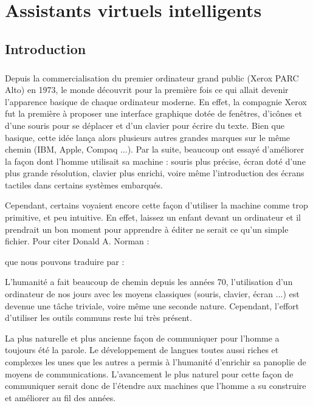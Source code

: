 \chapter{Assistants virtuels intelligents}

\section{Introduction}
\paragraph{}
Depuis la commercialisation du premier ordinateur grand public (Xerox PARC Alto) en 1973, le monde découvrit pour la première fois ce qui allait devenir l'apparence basique de chaque ordinateur moderne. En effet, la compagnie Xerox fut la première à proposer une interface graphique dotée de fenêtres, d'icônes et d'une souris pour se déplacer et d'un clavier pour écrire du texte. Bien que basique, cette idée lança alors plusieurs autres grandes marques sur le même chemin (IBM, Apple, Compaq ...). Par la suite, beaucoup ont essayé d'améliorer la façon dont l'homme utilisait sa machine : souris plus précise, écran doté d'une plus grande résolution, clavier plus enrichi, voire même l'introduction des écrans tactiles dans certains systèmes embarqués.
\par Cependant, certains voyaient encore cette façon d'utiliser la machine comme trop primitive, et peu intuitive. En effet, laissez un enfant devant un ordinateur et il prendrait un bon moment pour apprendre à éditer ne serait ce qu'un simple fichier. Pour citer Donald A. Norman \citep{don_norman} :
\begin{quote}
\end{quote}
que nous pouvons traduire par :
\begin{quote}
\end{quote} 
L'humanité a fait beaucoup de chemin depuis les années 70, l'utilisation d'un ordinateur de nos jours avec les moyens classiques (souris, clavier, écran ...) est devenue une tâche triviale, voire même une seconde nature. Cependant, l'effort d'utiliser les outils communs reste lui très présent.
\par La plus naturelle et plus ancienne façon de communiquer pour l'homme a toujours été la parole. Le développement de langues toutes aussi riches et complexes les unes que les autres a permis à l'humanité d'enrichir sa panoplie de moyens de communications. L'avancement le plus naturel pour cette façon de communiquer serait donc de l'étendre aux machines que l'homme a su construire et améliorer au fil des années.
